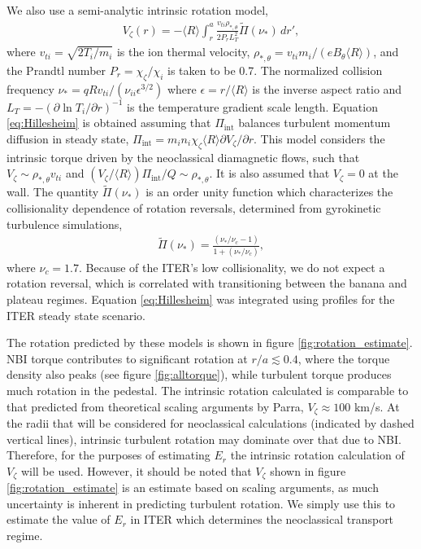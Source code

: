 \documentclass[aip, pop, preprint]{revtex4-1}
\numberwithin{figure}{section}
\numberwithin{equation}{section}
\begin{document}
We also use a semi-analytic intrinsic rotation model,\cite{Hillesheim2015}
\begin{gather}
V_{\zeta}(r) = - \langle R \rangle \int_{r}^a \frac{v_{ti} \rho_{*,\theta}} {2 P_r L_T^2} \widetilde{\Pi} (\nu_*) \, d r',
\label{eq:Hillesheim}
\end{gather} 
where $v_{ti} = \sqrt{2T_i/m_i}$ is the ion thermal velocity, $\rho_{*,\theta} = v_{ti} m_i/(e B_{\theta} \langle R \rangle) $, and the Prandtl number $P_r = \chi_{\zeta}/\chi_i$ is taken to be 0.7. The normalized collision frequency $\nu_* = q R v_{ti}/(\nu_{ii} \epsilon^{3/2})$ where $\epsilon = r/\langle R \rangle$ is the inverse aspect ratio and $L_T = - \left( \partial \ln T_i/ \partial r \right)^{-1}$ is the temperature gradient scale length. Equation \ref{eq:Hillesheim} is obtained assuming that $\Pi_{\text{int}}$ balances turbulent momentum diffusion in steady state, $\Pi_{\text{int}} = m_i n_i \chi_{\zeta} \langle R \rangle \partial V_{\zeta}/\partial r$. This model considers the intrinsic torque driven by the neoclassical diamagnetic flows, such that $V_{\zeta} \sim \rho_{*,\theta} v_{ti}$ and $(V_{\zeta}/\langle R \rangle) \Pi_{\text{int}}/Q \sim \rho_{*, \theta}$. It is also assumed that $V_{\zeta} = 0$ at the wall. %
The quantity $\widetilde{\Pi} (\nu_*)$ is an order unity function which characterizes the collisionality dependence of rotation reversals, determined from gyrokinetic turbulence simulations,\cite{Barnes2013}
\begin{gather}
\widetilde{\Pi} (\nu_*) = \frac{(\nu_*/\nu_c -1)}{1 + (\nu_*/\nu_c)},
\end{gather}
where $\nu_c = 1.7$. Because of the ITER's low collisionality, we do not expect a rotation reversal, which is correlated with transitioning between the banana and plateau regimes. Equation \ref{eq:Hillesheim} was integrated using profiles for the ITER steady state scenario. 

The rotation predicted by these models is shown in figure \ref{fig:rotation_estimate}. NBI torque contributes to significant rotation at $r/a \lesssim 0.4$, where the torque density also peaks (see figure \ref{fig:alltorque}), while turbulent torque produces much rotation in the pedestal.  The intrinsic rotation calculated is comparable to that predicted from theoretical scaling arguments by Parra,\cite{Parra2012} $V_{\zeta} \approx 100$ km/s. At the radii that will be considered for neoclassical calculations (indicated by dashed vertical lines), intrinsic turbulent rotation may dominate over that due to NBI. Therefore, for the purposes of estimating $E_r$ the intrinsic rotation calculation of $V_{\zeta}$ will be used. However, it should be noted that $V_{\zeta}$ shown in figure \ref{fig:rotation_estimate} is an estimate based on scaling arguments, as much uncertainty is inherent in predicting turbulent rotation. We simply use this to estimate the value of $E_r$ in ITER which determines the neoclassical transport regime.  
\FloatBarrier
\end{document}
